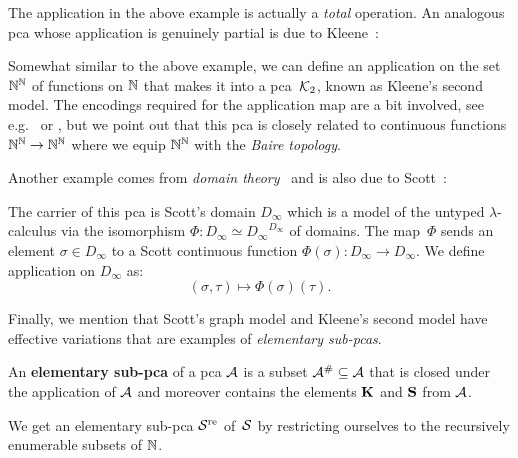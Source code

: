 The application in the above example is actually a \emph{total} operation. An
analogous pca whose application is genuinely partial is due to
Kleene~\cite{KleeneVesley1965}:
\begin{example}\label{Kleene-2}
  Somewhat similar to the above example, we can define an application on the set
  \(\Nat^\Nat\) of functions on \(\Nat\) that makes it into a pca~\(\Ktwo\),
  known as Kleene's second model.
  The encodings required for the application map are a bit involved, see
  e.g.~\cite[p.~30 and Section~2.1.2]{Bauer2023} or
  \cite[Section~1.4.3]{vanOosten2008}, but we point out that this pca is closely
  related to continuous functions \(\Nat^\Nat \to \Nat^\Nat\) where we equip
  \(\Nat^\Nat\) with the \emph{Baire topology}.
\end{example}

Another example comes from \emph{domain theory}~\cite{AmadioCurien1998} and is
also due to Scott~\cite{Scott1972}:
\begin{example}
  The carrier of this pca is Scott's domain \(D_\infty\) which is a model of the
  untyped \(\lambda\)-calculus via the isomorphism
  \(\Phi \colon D_\infty \simeq {D_\infty}^{D_\infty}\) of domains.
  The map~\(\Phi\) sends an element \(\sigma \in D_\infty\) to a Scott
  continuous function \(\Phi(\sigma) \colon D_\infty \to D_\infty\).
  We define application on \(D_\infty\) as:
  \[
    (\sigma,\tau) \mapsto \Phi(\sigma)(\tau).
  \]
\end{example}

Finally, we mention that Scott's graph model and Kleene's second model have
effective variations that are examples of \emph{elementary sub-pcas}.

\begin{definition}\label{def:elementary-sub-pca}
  An \textbf{elementary sub-pca} of a pca \(\AA\) is a subset
  \(\AA^\# \subseteq \AA\) that is closed under the application of \(\AA\) and
  moreover contains the elements \(\kcomb\) and \(\scomb\) from \(\AA\).
\end{definition}

\begin{example}\label{Scott-re}
  We get an elementary sub-pca \(\Scottre\) of~\(\Scott\) by restricting
  ourselves to the recursively enumerable subsets of \(\Nat\).
\end{example}


